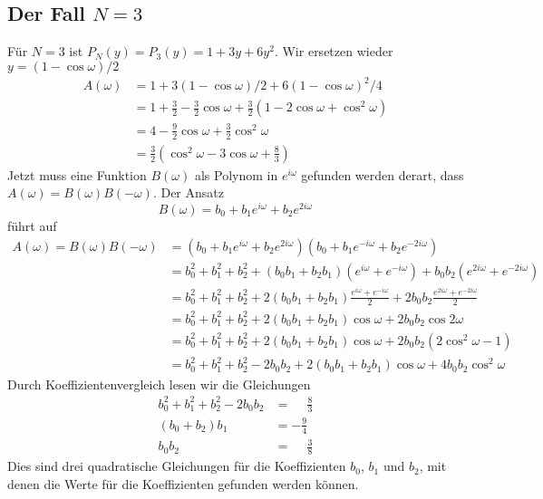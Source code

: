 \subsection{Der Fall $N=3$}
Für $N=3$ ist $P_N(y)=P_3(y)=1+3y+6y^2$.
Wir ersetzen wieder $y=(1-\cos\omega)/2$ 
\begin{align*}
A(\omega)
&=
1+3(1-\cos\omega)/2 + 6(1-\cos\omega)^2/4
\\
&=
1+\frac32-\frac32\cos\omega
+
\frac32(1-2\cos\omega+\cos^2\omega)
\\
&=
4
-
\frac92\cos\omega
+
\frac32\cos^2\omega
\\
&=
\frac32(\cos^2\omega -3\cos\omega + \frac{8}3)
\end{align*}
Jetzt muss eine Funktion $B(\omega)$ als Polynom in $e^{i\omega}$
gefunden werden derart, dass $A(\omega)=B(\omega)B(-\omega)$.
Der Ansatz
\[
B(\omega)
=
b_0 + b_1 e^{i\omega} + b_2 e^{2i\omega}
\]
führt auf
\begin{align*}
A(\omega)
=
B(\omega)B(-\omega)
&=
(b_0 + b_1 e^{i\omega} + b_2 e^{2i\omega})
(b_0 + b_1 e^{-i\omega} + b_2 e^{-2i\omega})
\\
&=
b_0^2 + b_1^2 + b_2^2
+
(b_0b_1 + b_2b_1)
(e^{i\omega}+e^{-i\omega})
+
b_0b_2
(e^{2i\omega}+e^{-2i\omega})
\\
&=
b_0^2 + b_1^2 + b_2^2
+
2(b_0b_1 + b_2b_1)
\frac{e^{i\omega}+e^{-i\omega}}2
+
2b_0b_2
\frac{e^{2i\omega}+e^{-2i\omega}}2
\\
&=
b_0^2 + b_1^2 + b_2^2
+
2(b_0b_1 + b_2b_1)
\cos\omega
+
2b_0b_2
\cos 2\omega
\\
&=
b_0^2 + b_1^2 + b_2^2
+
2(b_0b_1 + b_2b_1)
\cos\omega
+
2b_0b_2
(2\cos^2\omega-1)
\\
&=
b_0^2 + b_1^2 + b_2^2 -2b_0b_2
+
2(b_0b_1 + b_2b_1)
\cos\omega
+
4b_0b_2
\cos^2\omega
\end{align*}
Durch Koeffizientenvergleich lesen wir die Gleichungen
\begin{align*}
b_0^2+b_1^2+b_2^2-2b_0b_2&=\phantom{-}\frac83
\\
(b_0+b_2)b_1 &= -\frac94
\\
b_0b_2
&=
\phantom{-}
\frac{3}{8}
\end{align*}
Dies sind drei quadratische Gleichungen für die Koeffizienten
$b_0$, $b_1$ und $b_2$, mit denen die Werte für die Koeffizienten
gefunden werden können.



